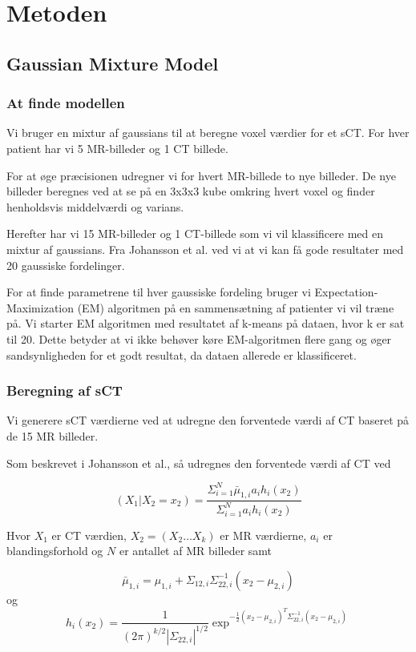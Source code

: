\section{Metoden}
\subsection{Gaussian Mixture Model}

\subsubsection{At finde modellen}
Vi bruger en mixtur af gaussians til at beregne voxel værdier
for et sCT. For hver patient har vi 5 MR-billeder og 1 CT billede.

For at øge præcisionen udregner vi for hvert MR-billede
to nye billeder. De nye billeder beregnes ved at se på en 3x3x3
kube omkring hvert voxel og finder henholdsvis middelværdi og varians.

Herefter har vi 15 MR-billeder og 1 CT-billede som vi vil klassificere
med en mixtur af gaussians. Fra Johansson et al. ved vi at vi kan få
gode resultater med 20 gaussiske fordelinger. 

For at finde parametrene til hver gaussiske fordeling bruger vi
Expectation-Maximization (EM) algoritmen på en sammensætning af patienter
vi vil træne på. Vi starter EM algoritmen med resultatet af k-means på
dataen, hvor k er sat til 20. Dette betyder at vi ikke behøver køre
EM-algoritmen flere gang og øger sandsynligheden for et godt resultat, da
dataen allerede er klassificeret.

\subsubsection{Beregning af sCT}

Vi generere sCT værdierne ved at udregne den forventede værdi af CT baseret på de 15 MR billeder. 

Som beskrevet i Johansson et al., så udregnes den forventede værdi af CT ved

\begin{equation}
(X_1 | X_2 = x_2) = \frac{\Sigma^{N}_{i=1} \bar{\mu}_{1,i} a_i h_i(x_2)}{\Sigma^{N}_{i=1} a_i h_i(x_2)}
\end{equation}

Hvor $X_1$ er CT værdien, $X_2 = (X_2 \dots X_k)$ er MR værdierne, $a_i$ er blandingsforhold og $N$ er antallet af MR billeder samt

\begin{equation}
 \bar{\mu}_{1,i} = \mu_{1,i} + \Sigma_{1 2, i} \Sigma^{-1}_{22, i}(x_2 - \mu_{2,i})
\end{equation}
og
\begin{equation}
h_i(x_2)= \frac{1}{( 2 \pi )^{k/2}|\Sigma_{22,i}|^{1/2}}\exp^{-\frac{1}{2}(x_2 - \mu_{2,i})^T \Sigma^{-1}_{22, i}(x_2 - \mu_{2,i})}
\end{equation}

